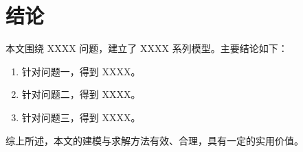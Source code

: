 \section{结论}

本文围绕 XXXX 问题，建立了 XXXX 系列模型。主要结论如下：

\begin{enumerate}
    \item 针对问题一，得到 XXXX。
    \item 针对问题二，得到 XXXX。
    \item 针对问题三，得到 XXXX。
\end{enumerate}

综上所述，本文的建模与求解方法有效、合理，具有一定的实用价值。
